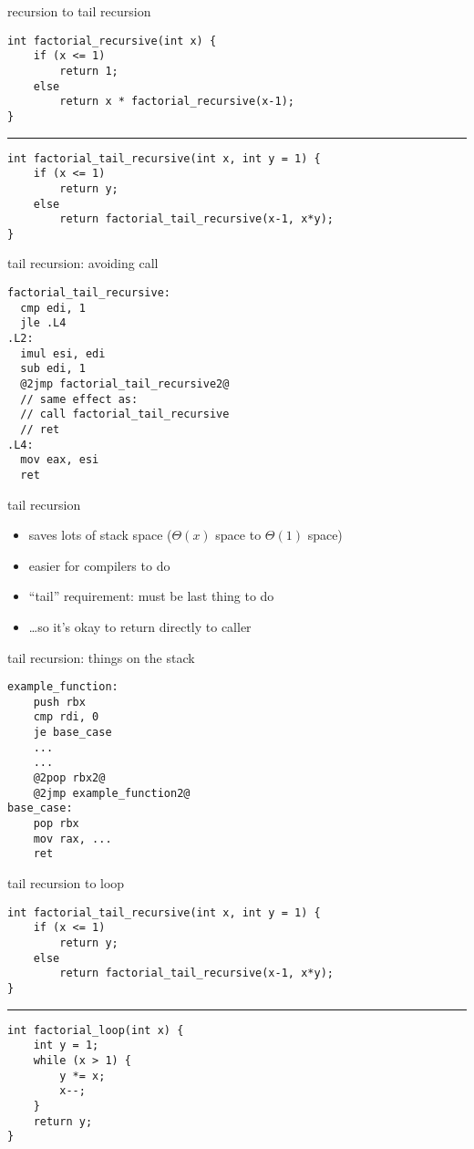 \begin{frame}[fragile,label=recurseToTail]{recursion to tail recursion}
\lstset{language=C++,style=smaller}
\begin{lstlisting}
int factorial_recursive(int x) {
    if (x <= 1)
        return 1;
    else
        return x * factorial_recursive(x-1);
}
\end{lstlisting}
\hrule
\begin{lstlisting}
int factorial_tail_recursive(int x, int y = 1) {
    if (x <= 1)
        return y;
    else
        return factorial_tail_recursive(x-1, x*y);
}
\end{lstlisting}
\end{frame}

\begin{frame}[fragile,label=noCall]{tail recursion: avoiding call}
\begin{lstlisting}
factorial_tail_recursive:
  cmp edi, 1
  jle .L4
.L2:
  imul esi, edi
  sub edi, 1
  @2jmp factorial_tail_recursive2@
  // same effect as:
  // call factorial_tail_recursive
  // ret
.L4:
  mov eax, esi
  ret
\end{lstlisting}
\end{frame}

\begin{frame}{tail recursion}
\begin{itemize}
    \item saves lots of stack space ($\Theta(x)$ space to $\Theta(1)$ space)
    \item easier for compilers to do
    \vspace{.5cm}
    \item ``tail'' requirement: must be last thing to do
    \item \ldots so it's okay to return directly to caller
\end{itemize}
\end{frame}

\begin{frame}[fragile,label=tailRecOnStack]{tail recursion: things on the stack}
\begin{lstlisting}
example_function:
    push rbx
    cmp rdi, 0
    je base_case
    ...
    ...
    @2pop rbx2@
    @2jmp example_function2@
base_case:
    pop rbx
    mov rax, ...
    ret
\end{lstlisting}
\end{frame}

\begin{frame}[fragile,label=tailToLoop]{tail recursion to loop}
\lstset{language=C++,style=smaller}
\begin{lstlisting}
int factorial_tail_recursive(int x, int y = 1) {
    if (x <= 1)
        return y;
    else
        return factorial_tail_recursive(x-1, x*y);
}
\end{lstlisting}
\hrule
\begin{lstlisting}
int factorial_loop(int x) {
    int y = 1;
    while (x > 1) {
        y *= x;
        x--;
    }
    return y;
}
\end{lstlisting}
\end{frame}
